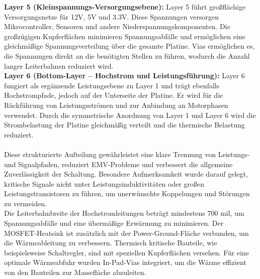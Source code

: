 \documentclass[paper=a4,11pt]{scrreprt}
\begin{document}
\textbf{Layer 5 (Kleinspannungs-Versorgungsebene):} Layer 5 führt großflächige Versorgungsnetze für 12V, 5V und 3.3V. Diese Spannungen versorgen Mikrocontroller, Sensoren und andere Niederspannungskomponenten. Die großzügigen Kupferflächen minimieren Spannungsabfälle und ermöglichen eine gleichmäßige Spannungsverteilung über die gesamte Platine. Vias ermöglichen es, die Spannungen direkt an die benötigten Stellen zu führen, wodurch die Anzahl langer Leiterbahnen reduziert wird.\\
\textbf{Layer 6 (Bottom-Layer – Hochstrom und Leistungsführung):} Layer 6 fungiert als ergänzende Leistungsebene zu Layer 1 und trägt ebenfalls Hochstrompfade, jedoch auf der Unterseite der Platine. Er wird für die Rückführung von Leistungsströmen und zur Anbindung an Motorphasen verwendet. Durch die symmetrische Anordnung von Layer 1 und Layer 6 wird die Strombelastung der Platine gleichmäßig verteilt und die thermische Belastung reduziert.\\
\\
Diese strukturierte Aufteilung gewährleistet eine klare Trennung von Leistungs- und Signalpfaden, reduziert EMV-Probleme und verbessert die allgemeine Zuverlässigkeit der Schaltung. Besondere Aufmerksamkeit wurde darauf gelegt, kritische Signale nicht unter Leistungsinduktivitäten oder großen Leistungstransistoren zu führen, um unerwünschte Koppelungen und Störungen zu vermeiden.\\
Die Leiterbahnbreite der Hochstromleitungen beträgt mindestens 700 mil, um Spannungsabfälle und eine übermäßige Erwärmung zu minimieren.
Der MOSFET-Heatsink ist zusätzlich mit der Power-Ground-Fläche verbunden, um die Wärmeableitung zu verbessern.
Thermisch kritische Bauteile, wie beispielsweise Schaltregler, sind mit speziellen Kupferflächen versehen.
Für eine optimale Wärmeabfuhr wurden In-Pad-Vias integriert, um die Wärme effizient von den Bauteilen zur Massefläche abzuleiten.
\end{document}
